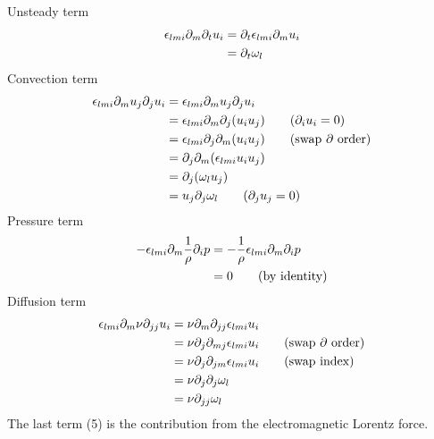 \documentclass[11pt]{article}
\newcommand{\PD}{\partial}
\begin{document}
\noindent
Unsteady term
\begin{align}
	\epsilon_{lmi} \PD_m \PD_t u_i
	& = \PD_t \epsilon_{lmi} \PD_m u_i \notag \\
	& = \PD_t \omega_l
\end{align}
Convection term
\begin{align}
	\epsilon_{lmi} \PD_m u_j \PD_j u_i
	& = \epsilon_{lmi} \PD_m u_j \PD_j u_i \notag \\
	& = \epsilon_{lmi} \PD_m \PD_j (u_i u_j) \qquad \text{($\PD_i u_i = 0$)} \notag \\
	& = \epsilon_{lmi} \PD_j \PD_m (u_i u_j) \qquad \text{(swap $\PD$ order)} \notag \\
	& = \PD_j \PD_m (\epsilon_{lmi} u_i u_j) \notag \\
	& = \PD_j (\omega_l u_j) \notag \\
	& = u_j \PD_j \omega_l \qquad \text{($\PD_j u_j = 0$)} \notag \\
\end{align}
Pressure term
\begin{align}
	- \epsilon_{lmi} \PD_m \frac{1}{\rho} \PD_i p
	& = -  \frac{1}{\rho} \epsilon_{lmi} \PD_m \PD_i p \notag \\
	& = 0 \qquad \text{(by identity)}
\end{align}
Diffusion term
\begin{align}
	\epsilon_{lmi} \PD_m \nu \PD_{jj} u_i
	& = \nu \PD_m \PD_{jj} \epsilon_{lmi} u_i \notag \\
	& = \nu \PD_j \PD_{mj} \epsilon_{lmi} u_i \qquad \text{(swap $\PD$ order)} \notag \\
	& = \nu \PD_j \PD_{jm} \epsilon_{lmi} u_i \qquad \text{(swap index)} \notag \\
	& = \nu \PD_j \PD_{j} \omega_l \notag \\
	& = \nu \PD_{jj} \omega_l \notag \\
\end{align}
\newpage
\noindent
The last term (5) is the contribution from the electromagnetic Lorentz force. 
\end{document}
